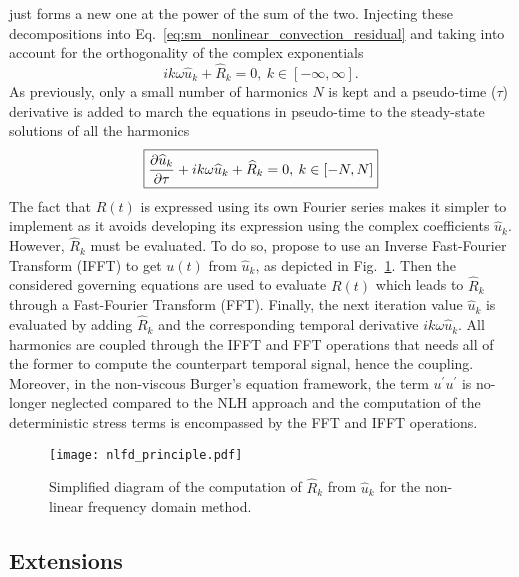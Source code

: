 just forms a new one at the power of the sum of the
two.
Injecting these decompositions into 
Eq.~\eqref{eq:sm_nonlinear_convection_residual} and taking into account
for the orthogonality of the complex exponentials
\begin{equation}
	i k \omega \widehat{u}_k + \widehat{R}_k = 0, \: k \in [-\infty, \infty].
\end{equation}
As previously, only a small number of harmonics $N$ is kept and 
a pseudo-time ($\tau$) derivative is added to march the equations
in pseudo-time to the steady-state solutions of all the harmonics
\begin{equation}
	\fbox{$
	\displaystyle \frac{\partial \widehat{u}_k}{\partial \tau} + 
	i k \omega \widehat{u}_k + \widehat{R}_k = 0, \: k \in [-N, N]
	$}
	\label{eq:sm_nlfd_subset_eq}
\end{equation}
The fact that $R(t)$ is expressed using its own Fourier series 
makes it simpler to implement 
as it avoids developing its expression using 
the complex coefficients $\widehat{u}_k$. 
However, $\widehat{R}_k$ must be evaluated. To do so, \citet{McMullen2001}
propose to use an Inverse Fast-Fourier Transform (IFFT) to get
$u(t)$ from $\widehat{u}_k$, as depicted
in Fig.~\ref{fig:nlfd_principle}. Then the considered governing equations
are used to evaluate $R(t)$ which leads to $\widehat{R}_k$
through a Fast-Fourier Transform (FFT). Finally, the next iteration value 
$\widehat{u}_k$
is evaluated by adding $\widehat{R}_k$ and 
the corresponding temporal derivative $i k \omega \widehat{u}_k$. All
harmonics are coupled through the IFFT and FFT operations
that needs all of the former to compute the counterpart temporal signal,
hence the coupling. Moreover, 
in the non-viscous Burger's equation framework, 
the term $u^\prime u^\prime$ is no-longer neglected compared to the
NLH approach and the computation of the deterministic stress terms is encompassed
by the FFT and IFFT operations.
\begin{figure}[htp]
  \centering
  \texttt{[image: nlfd\_principle.pdf]}
  \caption{Simplified diagram of the computation of $\widehat{R}_k$ from $\widehat{u}_k$
  for the non-linear frequency domain method.}
  \label{fig:nlfd_principle}
\end{figure}

\subsection{Extensions}

